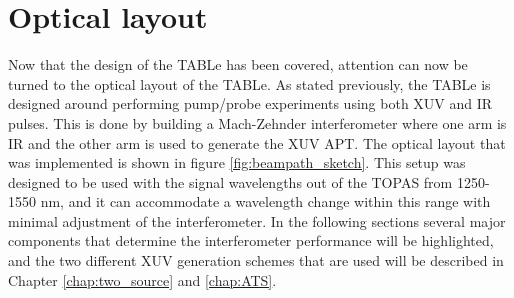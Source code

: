 \section{Optical layout}
\label{sec:optical_layout}

Now that the design of the TABLe has been covered, attention can now be turned to the optical layout of the TABLe.  As stated previously, the TABLe is designed around performing pump/probe experiments using both XUV and IR pulses.  This is done by building a Mach-Zehnder interferometer where one arm is IR and the other arm is used to generate the XUV APT.  The optical layout that was implemented is shown in figure \ref{fig:beampath_sketch}.  This setup was designed to be used with the signal wavelengths out of the TOPAS from 1250-1550 nm, and it can accommodate a wavelength change within this range with minimal adjustment of the interferometer.  In the following sections several major components that determine the interferometer performance will be highlighted, and the two different XUV generation schemes that are used will be described in Chapter \ref{chap:two_source} and \ref{chap:ATS}.

